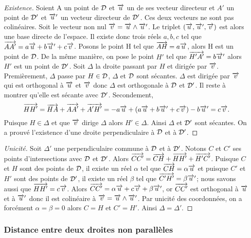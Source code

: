 \begin{proof}[Existence]
  Soient A un point de \(\mathcal{D}\) et \(\overrightarrow{u}\) un de ses vecteur directeur et
  \(A'\) un point de \(\mathcal{D}'\) et \(\overrightarrow{u}'\) un vecteur directeur de \(\mathcal{D}'\).
  Ces deux vecteurs ne sont pas colinéaires. Soit le vecteur non nul \(\overrightarrow{v} =
  \overrightarrow{u}\wedge\overrightarrow{u}'\). Le triplet \((\overrightarrow{u}, \overrightarrow{u}',\overrightarrow{v})\) est alors une base directe
  de l'espace. Il existe donc trois réels \(a, b, c\) tel que \(\overrightarrow{AA'} =
  a\overrightarrow{u} + b\overrightarrow{u}' + c\overrightarrow{v}\). Posons le point H tel que \(\overrightarrow{AH} = a\overrightarrow{u}\),
  alors H est un point de \(\mathcal{D}\). De la même manière, on pose le point
  \(H'\) tel que \(\overrightarrow{H'A'} = b\overrightarrow{u}'\) alors \(H'\) est un point de
  \(\mathcal{D}'\). Soit \(\Delta\) la droite passant par \(H\) et dirigée par
  \(\overrightarrow{v}\).  Premièrement, \(\Delta\) passe par \(H\in\mathcal{D}\), \(\Delta\) et
  \(\mathcal{D}\) sont sécantes. \(\Delta\) est dirigée par \(\overrightarrow{v}\) qui est
  orthogonal à \(\overrightarrow{u}\) et \(\overrightarrow{v}\) donc \(\Delta\) est orthogonale à \(\mathcal{D}\)
  et \(\mathcal{D}'\).  Il reste à montrer qu'elle est sécante avec \(\mathcal{D}'\).
  Secondement,
  \begin{equation}
    \overrightarrow{HH'} = \overrightarrow{HA} + \overrightarrow{AA'} + \overrightarrow{A'H'} = -a\overrightarrow{u} + (a\overrightarrow{u} +
    b\overrightarrow{u}' + c\overrightarrow{v}) - b\overrightarrow{u}' = c\overrightarrow{v}.
  \end{equation}
  Puisque \(H\in\Delta\) et que \(\overrightarrow{v}\) dirige \(\Delta\) alors
  \(H'\in\Delta\). Ainsi \(\Delta\) et \(\mathcal{D}'\) sont sécantes. On a prouvé
  l'existence d'une droite perpendiculaire à \(\mathcal{D}\) et à \(\mathcal{D}'\).
\end{proof}

\begin{proof}[Unicité]
  Soit \(\Delta'\) une perpendiculaire commune à \(\mathcal{D}\) et à \(\mathcal{D}'\).
  Notons \(C\) et \(C'\) ses points d'intersections avec \(\mathcal{D}\) et
  \(\mathcal{D}'\).  Alors \(\overrightarrow{CC'} = \overrightarrow{CH} + \overrightarrow{HH'} + \overrightarrow{H'C'}\).
  Puisque \(C\) et \(H\) sont des points de \(\mathcal{D}\), il existe un réel
  \(\alpha\) tel que \(\overrightarrow{CH} = \alpha\overrightarrow{u}\) et puisque \(C'\) et \(H'\)
  sont des points de \(\mathcal{D}'\), il existe un réel \(\beta\) tel que
  \(\overrightarrow{C'H'} = \beta\overrightarrow{u}'\); nous savons aussi que \(\overrightarrow{HH'} = c\overrightarrow{v}\).
  Alors \(\overrightarrow{CC'} = \alpha\overrightarrow{u} + c\overrightarrow{v} + \beta\overrightarrow{u}'\), or \(\overrightarrow{CC'}\) est
  orthogonal à \(\overrightarrow{u}\) et à \(\overrightarrow{u}'\) donc il est colinéaire à \(\overrightarrow{v} =
  \overrightarrow{u}\wedge\overrightarrow{u}'\). Par unicité des coordonnées, on a forcément \(\alpha =
  \beta = 0\) alors \(C = H\) et \(C' = H'\). Ainsi \(\Delta = \Delta'\).
\end{proof}

\subsubsection{Distance entre deux droites non parallèles}

